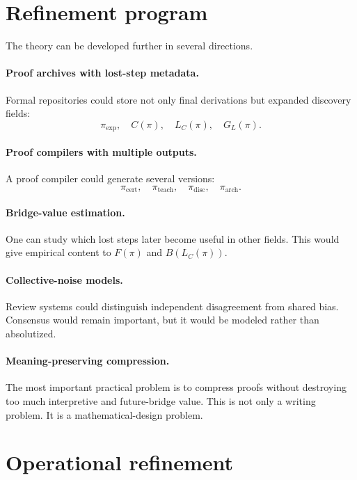 \documentclass[11pt,oneside]{book}
\theoremstyle{remark}
\begin{document}
\section{Refinement program}

The theory can be developed further in several directions.

\paragraph{Proof archives with lost-step metadata.}
Formal repositories could store not only final derivations but expanded discovery fields:
\[
        \pi_{\mathrm{exp}},\quad C(\pi),\quad L_C(\pi),\quad G_L(\pi).
\]

\paragraph{Proof compilers with multiple outputs.}
A proof compiler could generate several versions:
\[
        \pi_{\mathrm{cert}},
        \quad
        \pi_{\mathrm{teach}},
        \quad
        \pi_{\mathrm{disc}},
        \quad
        \pi_{\mathrm{arch}}.
\]

\paragraph{Bridge-value estimation.}
One can study which lost steps later become useful in other fields.  This would give empirical content to $F(\pi)$ and $B(L_C(\pi))$.

\paragraph{Collective-noise models.}
Review systems could distinguish independent disagreement from shared bias.  Consensus would remain important, but it would be modeled rather than absolutized.

\paragraph{Meaning-preserving compression.}
The most important practical problem is to compress proofs without destroying too much interpretive and future-bridge value.  This is not only a writing problem.  It is a mathematical-design problem.


\section{Operational refinement}
\end{document}

